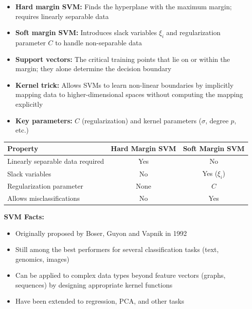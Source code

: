 \documentclass[11pt,a4paper]{article}
\theoremstyle{definition}
\theoremstyle{plain}
\theoremstyle{remark}
\begin{document}
\begin{tcolorbox}[colback=blue!5!white,colframe=blue!75!black,title=\textbf{SVM Key Concepts at a Glance}]
\begin{itemize}
    \item \textbf{Hard margin SVM:} Finds the hyperplane with the maximum margin; requires linearly separable data
    \item \textbf{Soft margin SVM:} Introduces slack variables $\xi_i$ and regularization parameter $C$ to handle non-separable data
    \item \textbf{Support vectors:} The critical training points that lie on or within the margin; they alone determine the decision boundary
    \item \textbf{Kernel trick:} Allows SVMs to learn non-linear boundaries by implicitly mapping data to higher-dimensional spaces without computing the mapping explicitly
    \item \textbf{Key parameters:} $C$ (regularization) and kernel parameters ($\sigma$, degree $p$, etc.)
\end{itemize}
\end{tcolorbox}

\begin{center}
\begin{tabular}{|l|c|c|}
\hline
\textbf{Property} & \textbf{Hard Margin SVM} & \textbf{Soft Margin SVM} \\
\hline
Linearly separable data required & Yes & No \\
\hline
Slack variables & No & Yes ($\xi_i$) \\
\hline
Regularization parameter & None & $C$ \\
\hline
Allows misclassifications & No & Yes \\
\hline
\end{tabular}
\end{center}

\textbf{SVM Facts:}
\begin{itemize}
    \item Originally proposed by Boser, Guyon and Vapnik in 1992
    \item Still among the best performers for several classification tasks (text, genomics, images)
    \item Can be applied to complex data types beyond feature vectors (graphs, sequences) by designing appropriate kernel functions
    \item Have been extended to regression, PCA, and other tasks
\end{itemize}
\end{document}
